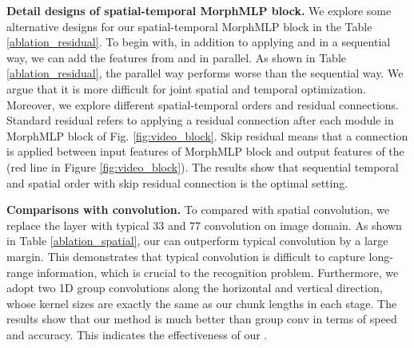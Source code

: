 \documentclass[runningheads]{llncs}
\begin{document}
\noindent
\textbf{Detail designs of spatial-temporal MorphMLP block.}
We explore some alternative designs for our spatial-temporal MorphMLP block in the Table \ref{ablation_residual}. To begin with, in addition to applying  and  in a sequential way, we can add the features from  and  in parallel. As shown in Table \ref{ablation_residual}, the parallel way performs worse than the sequential way. We argue that it is more difficult for joint spatial and temporal optimization. Moreover, we explore different spatial-temporal orders and residual connections. Standard residual refers to applying a residual connection after each module in MorphMLP block of Fig. \ref{fig:video_block}. Skip residual means that a connection is applied between input features of MorphMLP block and output features of the   (red line in Figure \ref{fig:video_block}).  The results show that sequential temporal and spatial order with skip residual connection is the optimal setting.




\noindent
\textbf{Comparisons with convolution.}
To compared with spatial convolution, we replace the  layer with typical 33  and 77 convolution on image domain. As shown in Table \ref{ablation_spatial}, our  can outperform typical convolution by a large margin. This demonstrates that typical convolution is difficult to capture long-range information, which is crucial to the recognition problem. Furthermore, we adopt two 1D group convolutions along the horizontal and vertical direction, whose kernel sizes are exactly the same as our chunk lengths in each stage. 
The results show that our method is much better than group conv in terms of speed and accuracy. This indicates the effectiveness of our . 
\end{document}
